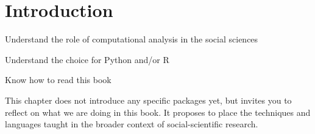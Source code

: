 \chapter{Introduction}
\label{chap:introduction}

\begin{abstract}{Abstract}
This chapter explains how the methods outlined in this book are
situated within the methodological and epistemological frameworks used
by social scientists. It argues why the use of Python and R is
fundamental for the computational analysis of communication. Finally,
it shows how this book can be used by students and scholars.
\end{abstract}


\begin{objectives}
\item Understand the role of computational analysis in the social sciences
\item Understand the choice for Python and/or R
\item Know how to read this book
\end{objectives}

\begin{feature}
This chapter does not introduce any specific packages yet, but invites
you to reflect on what we are doing in this book. It proposes to place
the techniques and languages taught in the broader context of
social-scientific research.
\end{feature}





